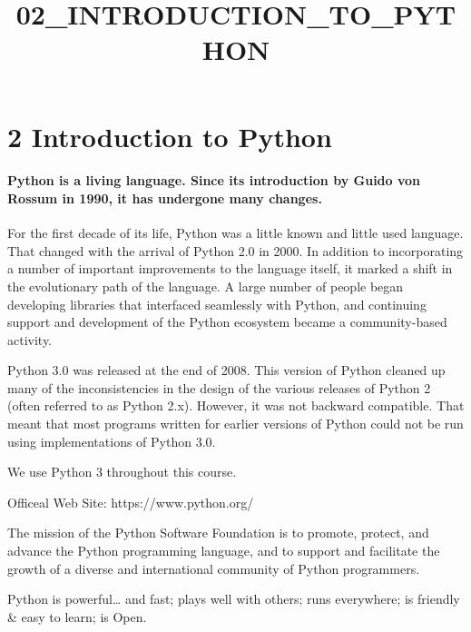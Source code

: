 \documentclass[11pt]{article}
\title{02\_INTRODUCTION\_TO\_PYTHON}
\begin{document}
    
    
    \maketitle
    
    

    
    \hypertarget{introduction-to-python}{%
\section{2 Introduction to Python}\label{introduction-to-python}}

    \hypertarget{python-is-a-living-language.-since-its-introduction-by-guido-von-rossum-in-1990-it-has-undergone-many-changes.}{%
\paragraph{Python is a living language. Since its introduction by Guido
von Rossum in 1990, it has undergone many
changes.}\label{python-is-a-living-language.-since-its-introduction-by-guido-von-rossum-in-1990-it-has-undergone-many-changes.}}

For the first decade of its life, Python was a little known and little
used language. That changed with the arrival of Python 2.0 in 2000. In
addition to incorporating a number of important improvements to the
language itself, it marked a shift in the evolutionary path of the
language. A large number of people began developing libraries that
interfaced seamlessly with Python, and continuing support and
development of the Python ecosystem became a community-based activity.

Python 3.0 was released at the end of 2008. This version of Python
cleaned up many of the inconsistencies in the design of the various
releases of Python 2 (often referred to as Python 2.x). However, it was
not backward compatible. That meant that most programs written for
earlier versions of Python could not be run using implementations of
Python 3.0.

We use Python 3 throughout this course.

Officeal Web Site: https://www.python.org/

The mission of the Python Software Foundation is to promote, protect,
and advance the Python programming language, and to support and
facilitate the growth of a diverse and international community of Python
programmers.

Python is powerful\ldots{} and fast; plays well with others; runs
everywhere; is friendly \& easy to learn; is Open.
\end{document}
